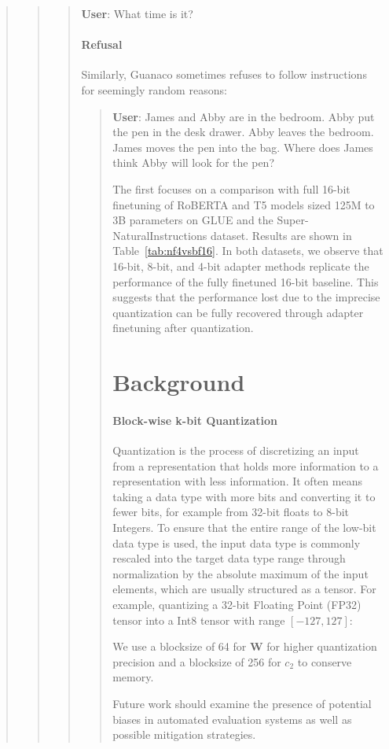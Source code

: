 \begin{quote}
\begin{quote}
\begin{quote}
    \textbf{User}: What time is it?

\paragraph{Refusal} Similarly, {Guanaco} sometimes refuses to follow instructions for seemingly random reasons:

\begin{quote}
    \textbf{User}: James and Abby are in the bedroom. Abby put the pen in the desk drawer. Abby leaves the bedroom. James moves the pen into the bag. Where does James think Abby will look for the pen?

The first focuses on a comparison with full 16-bit finetuning of RoBERTA and T5 models sized 125M to 3B parameters on GLUE and the Super-NaturalInstructions dataset. Results are shown in Table~\ref{tab:nf4vsbf16}. In both datasets, we observe that 16-bit, 8-bit, and 4-bit adapter methods replicate the performance of the fully finetuned 16-bit baseline. This suggests that the performance lost due to the imprecise quantization can be fully recovered through adapter finetuning after quantization.

\section{Background}
\paragraph{Block-wise k-bit Quantization} Quantization is the process of discretizing an input from a representation that holds more information to a representation with less information. It often means taking a data type with more bits and converting it to fewer bits, for example from 32-bit floats to 8-bit Integers. To ensure that the entire range of the low-bit data type is used, the input data type is commonly rescaled into the target data type range through normalization by the absolute maximum of the input elements, which are usually structured as a tensor. For example, quantizing a 32-bit Floating Point (FP32) tensor into a Int8 tensor with range $[-127, 127]$:

We use a blocksize of 64 for $\mathbf{W}$ for higher quantization precision and a blocksize of 256 for $c_2$ to conserve memory.

Future work should examine the presence of potential biases in automated evaluation systems as well as possible mitigation strategies.


\end{quote}
\end{quote}
\end{quote}
\end{quote}
